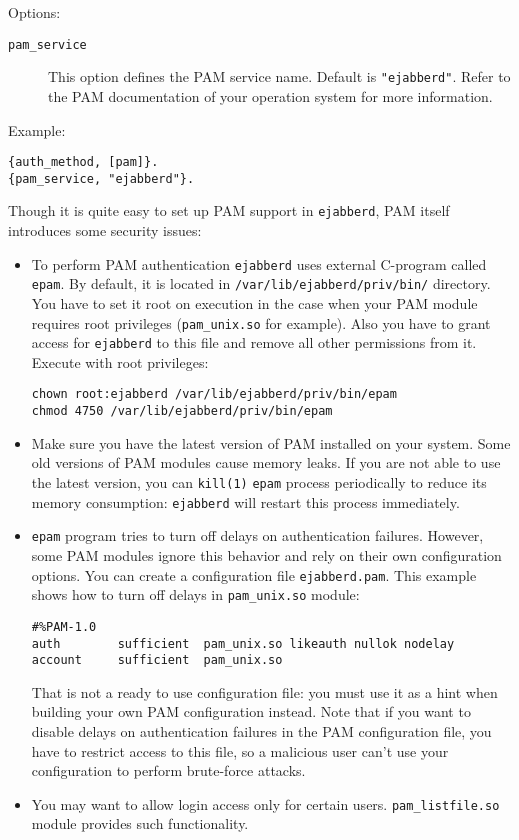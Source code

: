\documentclass[a4paper,10pt]{book}
\newcommand{\ind}[1]{\begin{latexonly}\index{#1}\end{latexonly}}
\newcommand{\bracehack}{\def\{{\char"7B}\def\}{\char"7D}}
\newcommand{\titem}[1]{\item[\bracehack\texttt{#1}]}
\newcommand{\term}[1]{\texttt{#1}}
\newcommand{\ejabberd}{\texttt{ejabberd}}
\begin{document}
Options:
\begin{description}
\titem{pam\_service}\ind{options!pam\_service}This option defines the PAM service name.
Default is \term{"ejabberd"}. Refer to the PAM documentation of your operation system
for more information.
\end{description}

Example:
\begin{verbatim}
{auth_method, [pam]}.
{pam_service, "ejabberd"}.
\end{verbatim}

Though it is quite easy to set up PAM support in \ejabberd{}, PAM itself introduces some
security issues:

\begin{itemize}
\item To perform PAM authentication \ejabberd{} uses external C-program called
\term{epam}. By default, it is located in \verb|/var/lib/ejabberd/priv/bin/|
directory. You have to set it root on execution in the case when your PAM module
requires root privileges (\term{pam\_unix.so} for example). Also you have to grant access
for \ejabberd{} to this file and remove all other permissions from it.
Execute with root privileges:
\begin{verbatim}
chown root:ejabberd /var/lib/ejabberd/priv/bin/epam
chmod 4750 /var/lib/ejabberd/priv/bin/epam
\end{verbatim}
\item Make sure you have the latest version of PAM installed on your system.
Some old versions of PAM modules cause memory leaks. If you are not able to use the latest
version, you can \term{kill(1)} \term{epam} process periodically to reduce its memory
consumption: \ejabberd{} will restart this process immediately.
\item \term{epam} program tries to turn off delays on authentication failures.
However, some PAM modules ignore this behavior and rely on their own configuration options.
You can create a configuration file \term{ejabberd.pam}.
This example shows how to turn off delays in \term{pam\_unix.so} module:
\begin{verbatim}
#%PAM-1.0
auth        sufficient  pam_unix.so likeauth nullok nodelay
account     sufficient  pam_unix.so
\end{verbatim}
That is not a ready to use configuration file: you must use it
as a hint when building your own PAM configuration instead. Note that if you want to disable
delays on authentication failures in the PAM configuration file, you have to restrict access
to this file, so a malicious user can't use your configuration to perform brute-force
attacks.
\item You may want to allow login access only for certain users. \term{pam\_listfile.so}
module provides such functionality.
\end{itemize}
\end{document}
